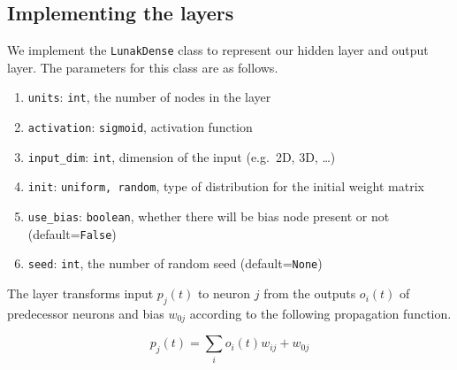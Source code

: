 \documentclass[11pt]{article}
\providecommand{\tightlist}{%
      \setlength{\itemsep}{0pt}\setlength{\parskip}{0pt}}
\begin{document}
    \hypertarget{implementing-the-layers}{%
\subsection{Implementing the layers}\label{implementing-the-layers}}

    We implement the \texttt{LunakDense} class to represent our hidden layer
and output layer. The parameters for this class are as follows.

\begin{enumerate}
\def\labelenumi{\arabic{enumi}.}
\tightlist
\item
  \texttt{units}: \texttt{int}, the number of nodes in the layer
\item
  \texttt{activation}:
  \texttt{\textquotesingle{}sigmoid\textquotesingle{}}, activation
  function
\item
  \texttt{input\_dim}: \texttt{int}, dimension of the input (e.g.~2D,
  3D, \ldots{})
\item
  \texttt{init}:
  \texttt{\textquotesingle{}uniform\textquotesingle{},\ \textquotesingle{}random\textquotesingle{}},
  type of distribution for the initial weight matrix
\item
  \texttt{use\_bias}: \texttt{boolean}, whether there will be bias node
  present or not (default=\texttt{False})
\item
  \texttt{seed}: \texttt{int}, the number of random seed
  (default=\texttt{None})
\end{enumerate}

    The layer transforms input \(p_j(t)\) to neuron \(j\) from the outputs
\(o_i(t)\) of predecessor neurons and bias \(w_{0j}\) according to the
following propagation function.

\[p_j(t) = \sum_{i} o_i(t) w_{ij} + w_{0j}\]
\end{document}

